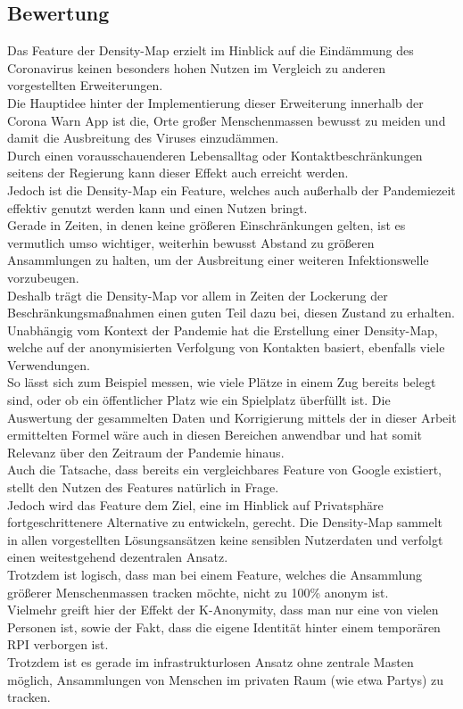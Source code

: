\documentclass[conference,compsoc]{IEEEtran}
\begin{document}
\subsection{Bewertung}
Das Feature der Density-Map erzielt im Hinblick auf die Eindämmung des Coronavirus keinen besonders hohen Nutzen im Vergleich zu anderen vorgestellten Erweiterungen.\\
Die Hauptidee hinter der Implementierung dieser Erweiterung innerhalb der Corona Warn App ist die, Orte großer Menschenmassen bewusst zu meiden und damit die Ausbreitung des Viruses einzudämmen.\\
Durch einen vorausschauenderen Lebensalltag oder Kontaktbeschränkungen seitens der Regierung kann dieser Effekt auch erreicht werden.\\
Jedoch ist die Density-Map ein Feature, welches auch außerhalb der Pandemiezeit effektiv genutzt werden kann und einen Nutzen bringt.\\
Gerade in Zeiten, in denen keine größeren Einschränkungen gelten, ist es vermutlich umso wichtiger, weiterhin bewusst Abstand zu größeren Ansammlungen zu halten, um der Ausbreitung einer weiteren Infektionswelle vorzubeugen.\\
Deshalb trägt die Density-Map vor allem in Zeiten der Lockerung der Beschränkungsmaßnahmen einen guten Teil dazu bei, diesen Zustand zu erhalten.\\
Unabhängig vom Kontext der Pandemie hat die Erstellung einer Density-Map, welche auf der anonymisierten Verfolgung von Kontakten basiert, ebenfalls viele Verwendungen.\\
So lässt sich zum Beispiel messen, wie viele Plätze in einem Zug bereits belegt sind, oder ob ein öffentlicher Platz wie ein Spielplatz überfüllt ist. Die Auswertung der gesammelten Daten und Korrigierung mittels der in dieser Arbeit ermittelten Formel wäre auch in diesen Bereichen anwendbar und hat somit Relevanz über den Zeitraum der Pandemie hinaus.\\

Auch die Tatsache, dass bereits ein vergleichbares Feature von Google existiert, stellt den Nutzen des Features natürlich in Frage.\\
Jedoch wird das Feature dem Ziel, eine im Hinblick auf Privatsphäre fortgeschrittenere Alternative zu entwickeln, gerecht. 
Die Density-Map sammelt in allen vorgestellten Lösungsansätzen keine sensiblen Nutzerdaten und verfolgt einen weitestgehend dezentralen Ansatz.\\
Trotzdem ist logisch, dass man bei einem Feature, welches die Ansammlung größerer Menschenmassen tracken möchte, nicht zu 100\% anonym ist.\\
Vielmehr greift hier der Effekt der K-Anonymity, dass man nur eine von vielen Personen ist, sowie der Fakt, dass die eigene Identität hinter einem temporären RPI verborgen ist.\\
Trotzdem ist es gerade im infrastrukturlosen Ansatz ohne zentrale Masten möglich, Ansammlungen von Menschen im privaten Raum (wie etwa Partys) zu tracken.\\
\end{document}
